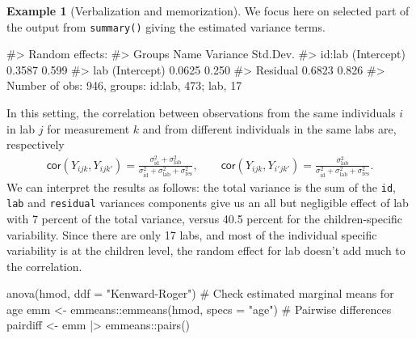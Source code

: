 \documentclass[
  11pt,
  letterpaper,
]{scrbook}
\newenvironment{Shaded}{\begin{snugshade}}{\end{snugshade}}
\newcommand{\AttributeTok}[1]{\textcolor[rgb]{0.40,0.45,0.13}{#1}}
\newcommand{\CommentTok}[1]{\textcolor[rgb]{0.37,0.37,0.37}{#1}}
\newcommand{\FunctionTok}[1]{\textcolor[rgb]{0.28,0.35,0.67}{#1}}
\newcommand{\NormalTok}[1]{\textcolor[rgb]{0.00,0.23,0.31}{#1}}
\newcommand{\OtherTok}[1]{\textcolor[rgb]{0.00,0.23,0.31}{#1}}
\newcommand{\SpecialCharTok}[1]{\textcolor[rgb]{0.37,0.37,0.37}{#1}}
\newcommand{\StringTok}[1]{\textcolor[rgb]{0.13,0.47,0.30}{#1}}
\theoremstyle{definition}
\theoremstyle{definition}
\newtheorem{example}{Example}[chapter]
\theoremstyle{remark}
\begin{document}
\begin{example}[Verbalization and
memorization]
We focus here on selected part of the output from \texttt{summary()}
giving the estimated variance terms.

\begin{Shaded}
\begin{Highlighting}[]
\CommentTok{\#\textgreater{} Random effects:}
\CommentTok{\#\textgreater{}  Groups   Name        Variance Std.Dev.}
\CommentTok{\#\textgreater{}  id:lab   (Intercept) 0.3587   0.599   }
\CommentTok{\#\textgreater{}  lab      (Intercept) 0.0625   0.250   }
\CommentTok{\#\textgreater{}  Residual             0.6823   0.826   }
\CommentTok{\#\textgreater{} Number of obs: 946, groups:  id:lab, 473; lab, 17}
\end{Highlighting}
\end{Shaded}

In this setting, the correlation between observations from the same
individuals \(i\) in lab \(j\) for measurement \(k\) and from different
individuals in the same labs are, respectively \begin{align*}
\mathsf{cor}(Y_{ijk}, Y_{ijk'}) = \frac{\sigma^2_{\text{id}} + \sigma^2_{\text{lab}}}{\sigma^2_{\text{id}} + \sigma^2_{\text{lab}} + \sigma^2_{\text{res}}}, \qquad \mathsf{cor}(Y_{ijk}, Y_{i'jk'}) = \frac{\sigma^2_{\text{lab}}}{\sigma^2_{\text{id}} + \sigma^2_{\text{lab}} + \sigma^2_{\text{res}}}.
\end{align*} We can interpret the results as follows: the total variance
is the sum of the \texttt{id}, \texttt{lab} and \texttt{residual}
variances components give us an all but negligible effect of lab with 7
percent of the total variance, versus 40.5 percent for the
children-specific variability. Since there are only 17 labs, and most of
the individual specific variability is at the children level, the random
effect for lab doesn't add much to the correlation.

\begin{Shaded}
\begin{Highlighting}[]
\FunctionTok{anova}\NormalTok{(hmod, }\AttributeTok{ddf =} \StringTok{"Kenward{-}Roger"}\NormalTok{)}
\CommentTok{\# Check estimated marginal means for age}
\NormalTok{emm }\OtherTok{\textless{}{-}}\NormalTok{ emmeans}\SpecialCharTok{::}\FunctionTok{emmeans}\NormalTok{(hmod, }\AttributeTok{specs =} \StringTok{"age"}\NormalTok{)}
\CommentTok{\# Pairwise differences}
\NormalTok{pairdiff }\OtherTok{\textless{}{-}}\NormalTok{ emm }\SpecialCharTok{|\textgreater{}}\NormalTok{ emmeans}\SpecialCharTok{::}\FunctionTok{pairs}\NormalTok{()}
\end{Highlighting}
\end{Shaded}


\end{example}
\end{document}
